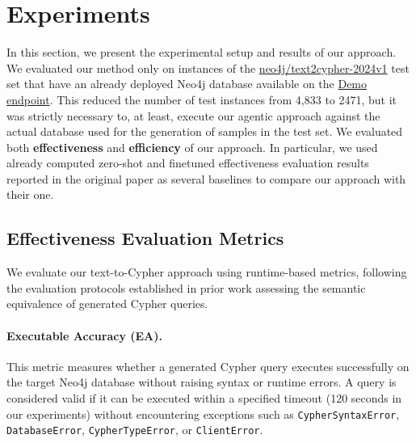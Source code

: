 \section{Experiments}

In this section, we present the experimental setup and results of our approach. We evaluated our method only on instances of the \href{https://huggingface.co/datasets/neo4j/text2cypher-2024v1}{neo4j/text2cypher-2024v1} test set that have an already deployed Neo4j database available on the \href{https://demo.neo4jlabs.com:7473/browser/}{Demo endpoint}. This reduced the number of test instances from 4,833 to 2471, but it was strictly necessary to, at least, execute our agentic approach against the actual database used for the generation of samples in the test set. We evaluated both \textbf{effectiveness} and \textbf{efficiency} of our approach. In particular, we used already computed zero-shot and finetuned effectiveness evaluation results reported in the original paper \cite{neo4jlabs-text2cypher-2024} as several baselines to compare our approach with their one.

\subsection{Effectiveness Evaluation Metrics}

We evaluate our text-to-Cypher approach using runtime-based metrics, following the evaluation protocols established in prior work \cite{neo4jlabs-text2cypher-2024, cypherbench-megagonlabs-2024} assessing the semantic equivalence of generated Cypher queries.

\paragraph{Executable Accuracy (EA).} This metric measures whether a generated Cypher query executes successfully on the target Neo4j database without raising syntax or runtime errors. A query is considered valid if it can be executed within a specified timeout (120 seconds in our experiments) without encountering exceptions such as \texttt{CypherSyntaxError}, \texttt{DatabaseError}, \texttt{CypherTypeError}, or \texttt{ClientError}.

